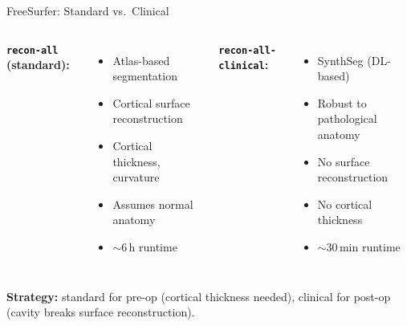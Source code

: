 \begin{frame}{FreeSurfer: Standard vs.\ Clinical}

  \begin{columns}[T]
    \textbf{\texttt{recon-all} (standard):}
    \begin{itemize}
      \item Atlas-based segmentation
      \item Cortical surface reconstruction
      \item Cortical thickness, curvature
      \item Assumes normal anatomy
      \item $\sim$6\,h runtime
    \end{itemize}

    \textbf{\texttt{recon-all-clinical}:}
    \begin{itemize}
      \item SynthSeg (DL-based)
      \item Robust to pathological anatomy
      \item No surface reconstruction
      \item No cortical thickness
      \item $\sim$30\,min runtime
    \end{itemize}
  \end{columns}

  \bigskip

  \textbf{Strategy:} standard for pre-op (cortical thickness needed),
  clinical for post-op (cavity breaks surface reconstruction).

\end{frame}

